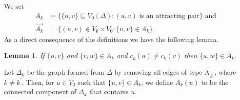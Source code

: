 \documentclass[a4paper,12pt]{article}
\def\D{\Delta }
\newtheorem{lemma}[theorem]{Lemma}
\numberwithin{equation}{section}
\numberwithin{figure}{section}
\begin{document}
We set 
\begin{align}
A_k&=\{\{u,v\}\subseteq V_0(\D): (u,v) \textrm{ is an attracting pair}\} \textrm{ and }\\\label{eq:attset}
\vec{A_k}&=\{(u,v)\in V_0\times V_0: \{u,v\}\in A_k\}.
\end{align}
As a direct consequence of the definitions we have the following lemma.
\begin{lemma}
If $\{u,v\}$ and $\{v,w\}\in A_k$ and $c_k(u)\neq c_k(v)$ then 
$\{u,w\}\in A_k$.
\end{lemma}
Let $\D_k$ be the graph formed from $\D$ by removing all edges of type
$X_{k^\prime}$, where $k\neq k^\prime$. Then, 
for $u\in V_0$ such that $\{u,v\}\in A_k$, we define 
$A_k(u)$ to be the connected component of $\D_k$ that contains $u$. 


\end{document}
